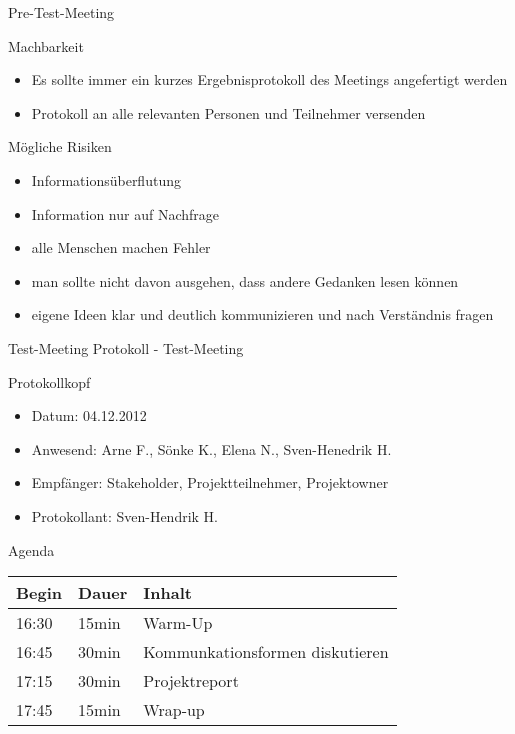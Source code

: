 \documentclass[t, 10pt]{beamer}
\begin{document}
\begin{frame}{Pre-Test-Meeting}
\begin{block}{Machbarkeit}
\begin{itemize}
\item Es sollte immer ein kurzes Ergebnisprotokoll des Meetings angefertigt werden
\item Protokoll an alle relevanten Personen und Teilnehmer versenden
\end{itemize}
\end{block}
\begin{block}{Mögliche Risiken}
\begin{itemize}
\item Informationsüberflutung
\item Information nur auf Nachfrage
\item alle Menschen machen Fehler
\item man sollte nicht davon ausgehen, dass andere Gedanken lesen können
\item eigene Ideen klar und deutlich kommunizieren und nach Verständnis fragen
\end{itemize}
\end{block}
\end{frame}

\begin{frame}{Test-Meeting Protokoll - Test-Meeting}
\begin{block}{Protokollkopf}
\begin{itemize}
\item Datum: 04.12.2012
\item Anwesend: Arne F., Sönke K., Elena N., Sven-Henedrik H.
\item Empfänger: Stakeholder, Projektteilnehmer, Projektowner
\item Protokollant: Sven-Hendrik H.
\end{itemize}
\end{block}

\begin{block}{Agenda}
\begin{tabular}[t]{l|l|l}
Begin & Dauer & Inhalt \\ \hline \hline
16:30 & 15min & Warm-Up \\ \hline
16:45 & 30min & Kommunkationsformen diskutieren \\ \hline
17:15 & 30min & Projektreport \\ \hline
17:45 & 15min & Wrap-up \\ \hline
\end{tabular}
\end{block}
\end{frame}
\end{document}
